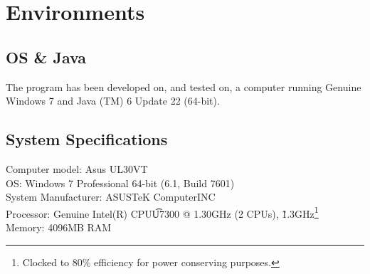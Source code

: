 \section{Environments}
\subsection{OS \& Java}
The program has been developed on, and tested on, a computer running Genuine Windows 7 and Java (TM) 6 Update 22 (64-bit).

\subsection{System Specifications}
Computer model: Asus UL30VT\\
OS: Windows 7 Professional 64-bit (6.1, Build 7601)\\
System Manufacturer: ASUSTeK ComputerINC\\
Processor: Genuine Intel(R) CPU\t U7300 @ 1.30GHz (2 CPUs), \~1.3GHz\footnote{Clocked to 80\% efficiency for power conserving purposes.}\\
Memory: 4096MB RAM\\